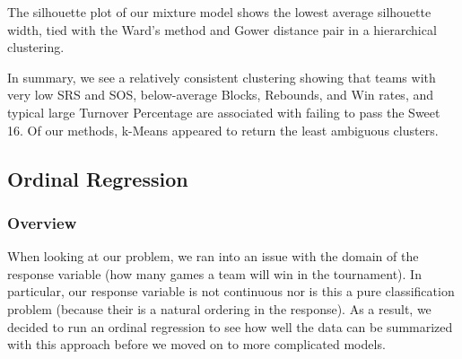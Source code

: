 \documentclass[10pt,a4paper, hidelinks]{article} %
\begin{document}
The silhouette plot of our mixture model shows the lowest average silhouette width, tied with the Ward's method and Gower distance pair in a hierarchical clustering.

In summary, we see a relatively consistent clustering showing that teams with very low SRS and SOS, below-average Blocks, Rebounds, and Win rates, and typical large Turnover Percentage are associated with failing to pass the Sweet 16.  Of our methods, k-Means appeared to return the least ambiguous clusters.

\subsection{Ordinal Regression}
\subsubsection{Overview}
When looking at our problem, we ran into an issue with the domain of the response variable (how many games a team will win in the tournament). In particular, our response variable is not continuous nor is this a pure classification problem (because their is a natural ordering in the response). As a result, we decided to run an ordinal regression to see how well the data can be summarized with this approach before we moved on to more complicated models.  
\end{document}
